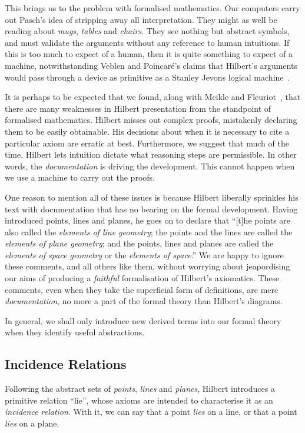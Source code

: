 This brings us to the problem with formalised mathematics. Our computers carry out Pasch's idea of stripping away all interpretation. They might as well be reading about \emph{mugs}, \emph{tables} and \emph{chairs}. They see nothing but abstract symbols, and must validate the arguments without any reference to human intuitions. If this is too much to expect of a human, then it is quite something to expect of a machine, notwithstanding Veblen and Poincar\'{e}'s claims that Hilbert's arguments would pass through a device as primitive as a Stanley Jevons logical machine~\cite{PoincareReview,VeblenHilbertReview}.

It is perhaps to be expected that we found, along with Meikle and Fleuriot~\cite{MeikleFleuriotFormalizingHilbert}, that there are many weaknesses in Hilbert presentation from the standpoint of formalised mathematics. Hilbert misses out complex proofs, mistakenly declaring them to be easily obtainable. His decisions about when it is necessary to cite a particular axiom are erratic at best. Furthermore, we suggest that much of the time, Hilbert lets intuition dictate what reasoning steps are permissible. In other words, the \emph{documentation} is driving the development. This cannot happen when we use a machine to carry out the proofs.

One reason to mention all of these issues is because Hilbert liberally sprinkles his text with documentation that has no bearing on the formal development. Having introduced points, lines and planes, he goes on to declare that ``[t]he points are also called the \emph{elements of line geometry}; the points and the lines are called the \emph{elements of plane geometry}; and the points, lines and planes are called the \emph{elements of space geometry} or the \emph{elements of space}.'' We are happy to ignore these comments, and all others like them, without worrying about jeapordising our aims of producing a \emph{faithful} formalisation of Hilbert's axiomatics. These comments, even when they take the superficial form of definitions, are mere \emph{documentation}, no more a part of the formal theory than Hilbert's diagrams. 

In general, we shall only introduce new derived terms into our formal theory when they identify useful abstractions.

\subsection{Incidence Relations}
Following the abstract sets of \emph{points}, \emph{lines} and \emph{planes}, Hilbert introduces a primitive  relation ``lie'', whose axioms are intended to characterise it as an \emph{incidence relation}. With it, we can say that a point \emph{lies} on a line, or that a point \emph{lies} on a plane. 

